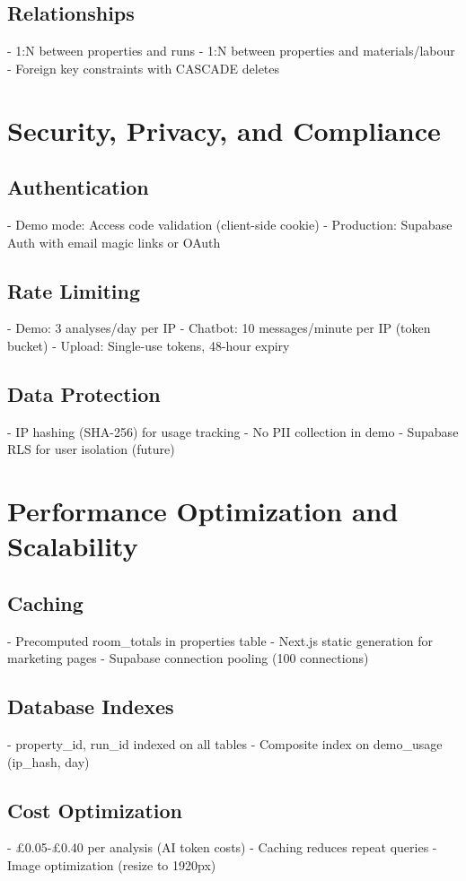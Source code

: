 \documentclass[11pt,a4paper]{article}
\begin{document}
\subsection{Relationships}
- 1:N between properties and runs
- 1:N between properties and materials/labour
- Foreign key constraints with CASCADE deletes

\section{Security, Privacy, and Compliance}

\subsection{Authentication}
- Demo mode: Access code validation (client-side cookie)
- Production: Supabase Auth with email magic links or OAuth

\subsection{Rate Limiting}
- Demo: 3 analyses/day per IP
- Chatbot: 10 messages/minute per IP (token bucket)
- Upload: Single-use tokens, 48-hour expiry

\subsection{Data Protection}
- IP hashing (SHA-256) for usage tracking
- No PII collection in demo
- Supabase RLS for user isolation (future)

\section{Performance Optimization and Scalability}

\subsection{Caching}
- Precomputed room\_totals in properties table
- Next.js static generation for marketing pages
- Supabase connection pooling (100 connections)

\subsection{Database Indexes}
- property\_id, run\_id indexed on all tables
- Composite index on demo\_usage (ip\_hash, day)

\subsection{Cost Optimization}
- £0.05-£0.40 per analysis (AI token costs)
- Caching reduces repeat queries
- Image optimization (resize to 1920px)
\end{document}
